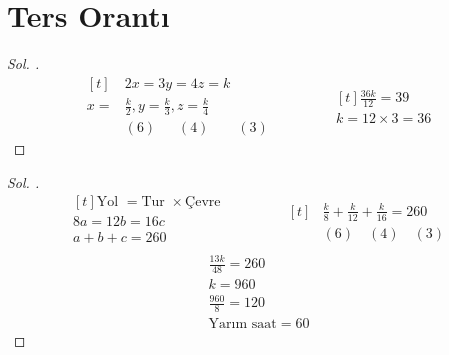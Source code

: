 \documentclass{article}
\theoremstyle{mytheoremstyle}
\theoremstyle{mytheoremstyle}
\theoremstyle{myproblemstyle}
\begin{document}
\section{Ters Orantı}


\begin{problem}[$ x, y, z $ sayıları sırasıyla $ 2, 3, 4 $ ile ters orantılıdır. $ x + y + z = 39 $ ise $ z = ? $]
\end{problem}

\begin{proof}[\textit{ Sol. }]
  \begin{equation*}
    \begin{aligned}[t]
      &2x = 3y = 4z = k\\
      x = &\frac{k}{2},
      y = \frac{k}{3},
      z = \frac{k}{4}\\
      &(6)\quad\;\;(4)\qquad(3)
    \end{aligned}
    \qquad\qquad
    \begin{aligned}[t]
      \frac{36k}{12} = 39\\
      k =12 \times 3 = 36
    \end{aligned}
  \end{equation*}
\end{proof}

\begin{problem}
\end{problem}

\begin{proof}[\textit{ Sol. }]
  \begin{equation*}
    \begin{aligned}[t]
      \text{Yol } = \text{Tur } \times \text{Çevre}\\
      8a = 12b = 16c\\
      a + b + c = 260\\
    \end{aligned}
    \qquad\qquad
    \begin{aligned}[t]
      &\frac{k}{8} + \frac{k}{12} + \frac{k}{16} = 260\\
      &(6)\quad\!(4)\quad(3)
    \end{aligned}
  \end{equation*}
  \begin{align*}
    \frac{13k}{48} = 260\\k = 960\\
    \frac{960}{8} = 120\\
    \text{Yarım saat} = 60
  \end{align*}
\end{proof}
\end{document}

